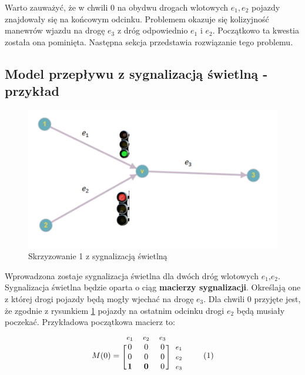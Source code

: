 \documentclass[12pt]{book}
\newcommand\addtag{\refstepcounter{equation}
\tag{\theequation}}
\begin{document}
Warto zauważyć, że w chwili 0 na obydwu drogach wlotowych $e_1,e_2$ pojazdy znajdowały się na końcowym odcinku. Problemem okazuje się kolizyjność manewrów wjazdu na drogę $e_3$ z dróg odpowiednio $e_1$ i $e_2$. Początkowo ta kwestia została ona pominięta. Następna sekcja przedstawia rozwiązanie tego problemu.
\subsection{Model przepływu z sygnalizacją świetlną - przykład}
\begin{figure}[H]
  \centering
    \includegraphics[width=14cm]{skrz_1_sygnalizacja}
 \caption{Skrzyzowanie 1 z sygnalizacją świetlną}
 \label{fig:skrz_1_sygnalizacja}
\end{figure}

Wprowadzona zostaje sygnalizacja świetlna dla dwóch dróg wlotowych $e_1$,$e_2$. Sygnalizacja świetlna będzie oparta o ciąg \textbf{macierzy sygnalizacji}. Określają one z której drogi pojazdy będą mogły wjechać na drogę $e_3$. Dla chwili 0 przyjęte jest, że zgodnie z rysunkiem \ref{fig:skrz_1_sygnalizacja} pojazdy na ostatnim odcinku drogi $e_2$ będą musiały poczekać. 
Przykładowa początkowa macierz to:
\begin{equation*}
  M(0)=
  \begin{blockarray}{*{3}{c} l}
    \begin{block}{*{3}{>{$\footnotesize}c<{$}} l}
     $e_1$ & $e_2$ & $e_3$\\
    \end{block}
    \begin{block}{[*{3}{c}]>{$\footnotesize}l<{$}}
       0 & 0 & 0 & $e_1$ \\
       0 & 0 & 0 & $e_2$ \\
       \textbf{1} & \textbf{0} & 0 & $e_3$ \\
    \end{block}
  \end{blockarray} \addtag
\end{equation*}
\end{document}
